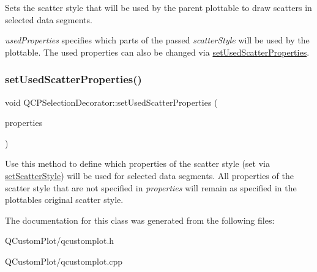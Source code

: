 Sets the scatter style that will be used by the parent plottable to draw scatters in selected data segments.

{\itshape used\+Properties} specifies which parts of the passed {\itshape scatter\+Style} will be used by the plottable. The used properties can also be changed via \mbox{\hyperlink{class_q_c_p_selection_decorator_a808c1607cd4e83869c04986e332455c0}{set\+Used\+Scatter\+Properties}}. \mbox{\label{class_q_c_p_selection_decorator_a808c1607cd4e83869c04986e332455c0}} 
\subsubsection{\texorpdfstring{set\+Used\+Scatter\+Properties()}{setUsedScatterProperties()}}
{\footnotesize\ttfamily void Q\+C\+P\+Selection\+Decorator\+::set\+Used\+Scatter\+Properties (\begin{DoxyParamCaption}\item[{const Q\+C\+P\+Scatter\+Style\+::\+Scatter\+Properties \&}]{properties }\end{DoxyParamCaption})}

Use this method to define which properties of the scatter style (set via \mbox{\hyperlink{class_q_c_p_selection_decorator_ab403a613289714ff4fd4a0c0371ab116}{set\+Scatter\+Style}}) will be used for selected data segments. All properties of the scatter style that are not specified in {\itshape properties} will remain as specified in the plottable\textquotesingle{}s original scatter style. 

The documentation for this class was generated from the following files\+:\begin{DoxyCompactItemize}
\item 
Q\+Custom\+Plot/qcustomplot.\+h\item 
Q\+Custom\+Plot/qcustomplot.\+cpp\end{DoxyCompactItemize}
